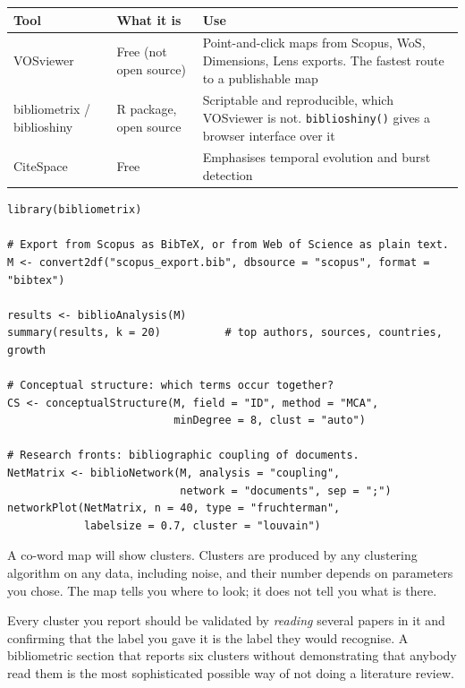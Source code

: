 \begin{center}
\small
\begin{tabular}{@{}L{2.6cm}L{3.2cm}L{8.6cm}@{}}
\toprule
\textbf{Tool} & \textbf{What it is} & \textbf{Use} \\
\midrule
VOSviewer  & Free (not open source)
           & Point-and-click maps from Scopus, WoS, Dimensions, Lens exports.
             The fastest route to a publishable map \\
bibliometrix / biblioshiny & R package, open source
           & Scriptable and reproducible, which VOSviewer is not.
             \texttt{biblioshiny()} gives a browser interface over it \\
CiteSpace  & Free
           & Emphasises temporal evolution and burst detection \\
\bottomrule
\end{tabular}
\end{center}

\begin{lstlisting}[language=Rlang, caption={A minimal reproducible field map. The
whole point of scripting it is that the figure in your thesis can be
regenerated when you add 40 more records.}]
library(bibliometrix)

# Export from Scopus as BibTeX, or from Web of Science as plain text.
M <- convert2df("scopus_export.bib", dbsource = "scopus", format = "bibtex")

results <- biblioAnalysis(M)
summary(results, k = 20)          # top authors, sources, countries, growth

# Conceptual structure: which terms occur together?
CS <- conceptualStructure(M, field = "ID", method = "MCA",
                          minDegree = 8, clust = "auto")

# Research fronts: bibliographic coupling of documents.
NetMatrix <- biblioNetwork(M, analysis = "coupling",
                           network = "documents", sep = ";")
networkPlot(NetMatrix, n = 40, type = "fruchterman",
            labelsize = 0.7, cluster = "louvain")
\end{lstlisting}

\begin{alertbox}
A co-word map will show clusters. Clusters are produced by any clustering
algorithm on any data, including noise, and their number depends on parameters
you chose. The map tells you where to look; it does not tell you what is there.

\medskip
Every cluster you report should be validated by \emph{reading} several papers
in it and confirming that the label you gave it is the label they would
recognise. A bibliometric section that reports six clusters without
demonstrating that anybody read them is the most sophisticated possible way of
not doing a literature review.
\end{alertbox}

